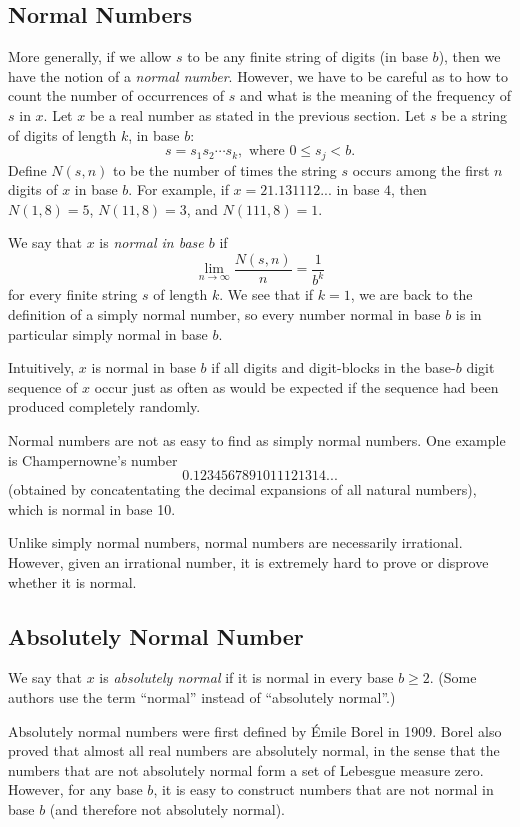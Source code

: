\documentclass[12pt]{article}
\begin{document}
\subsection{Normal Numbers}
More generally, if we allow $s$ to be any finite string of digits (in base $b$), then we have the notion of a \emph{normal number}.  However, we have to be careful as to how to count the number of occurrences of $s$ and what is the meaning of the frequency of $s$ in $x$.  Let $x$ be a real number as stated in the previous section.  Let $s$ be a string of digits of length $k$, in base $b$:
$$s=s_1s_2\cdots s_k,\mbox{ where }0\le s_j< b.$$
Define $N(s,n)$ to be the number of times the string $s$ occurs among the first $n$ digits of $x$ in base $b$.  For example, if $x=21.131112...$ in base $4$, then $N(1,8)=5$, $N(11,8)=3$, and $N(111,8)=1$.

We say that $x$ is \emph{normal in base $b$} if
\[
\lim_{n\to\infty} \frac{N(s,n)}{n} = \frac{1}{b^k}
\]
for every finite string $s$ of length $k$.  We see that if $k=1$, we are back to the definition of a simply normal number, so every number normal in base $b$ is in particular simply normal in base $b$.

Intuitively, $x$ is normal in base $b$ if all digits and digit-blocks in the base-$b$ digit sequence of $x$ occur just as often as would be expected if the sequence had been produced completely randomly.

Normal numbers are not as easy to find as simply normal numbers.  One example is Champernowne's number
\[
0.1234567891011121314...
\]
(obtained by concatentating the decimal expansions of all natural numbers), which is normal in base 10.

Unlike simply normal numbers, normal numbers are necessarily irrational.  However, given an irrational number, it is extremely hard to prove or disprove whether it is normal.  

\subsection{Absolutely Normal Number}
We say that $x$ is \emph{absolutely normal} if it is normal in every base $b\ge 2$. (Some authors use the term ``normal'' instead of ``absolutely normal''.)

Absolutely normal numbers were first defined by \'{E}mile Borel in 1909. Borel also proved that almost all real numbers are absolutely normal, in the sense that the numbers that are not absolutely normal form a set of Lebesgue measure zero.
However, for any base $b$, it is easy to construct  numbers that are not normal in base $b$ (and therefore not absolutely normal).
\end{document}
